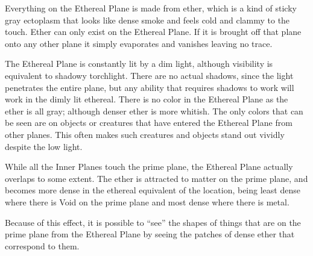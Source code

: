 \begin{multicols*}{2}
Everything on the Ethereal Plane is made from ether, which is a kind of sticky gray ectoplasm that looks like dense smoke and feels cold and clammy to the touch. Ether can only exist on the Ethereal Plane. If it is brought off that plane onto any other plane it simply evaporates and vanishes leaving no trace.

The Ethereal Plane is constantly lit by a dim light, although visibility is equivalent to shadowy torchlight. There are no actual shadows, since the light penetrates the entire plane, but any ability that requires shadows to work will work in the dimly lit ethereal. There is no color in the Ethereal Plane as the ether is all gray; although denser ether is more whitish. The only colors that can be seen are on objects or creatures that have entered the Ethereal Plane from other planes. This often makes such creatures and objects stand out vividly despite the low light.

While all the Inner Planes touch the prime plane, the Ethereal Plane actually overlaps to some extent. The ether is attracted to matter on the prime plane, and becomes more dense in the ethereal equivalent of the location, being least dense where there is Void on the prime plane and most dense where there is metal.

Because of this effect, it is possible to “see” the shapes of things that are on the prime plane from the Ethereal Plane by seeing the patches of dense ether that correspond to them.

\end{multicols*}
